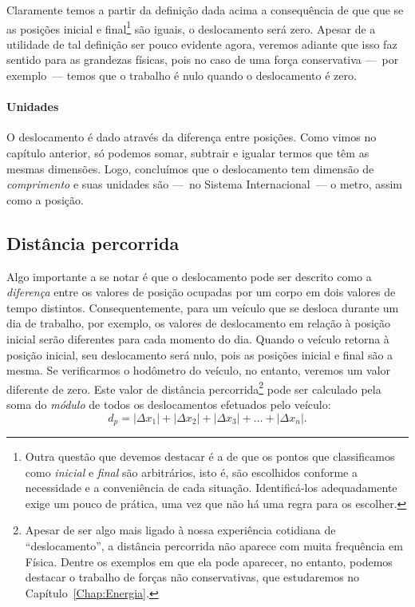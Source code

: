 Claramente temos a partir da definição dada acima a consequência de que que se as posições inicial e final\footnote{Outra questão que devemos destacar é a de que os pontos que classificamos como \emph{inicial} e \emph{final} são arbitrários, isto é, são escolhidos conforme a necessidade e a conveniência de cada situação. Identificá-los adequadamente exige um pouco de prática, uma vez que não há uma regra para os escolher.} são iguais, o deslocamento será zero. Apesar de a utilidade de tal definição ser pouco evidente agora, veremos adiante que isso faz sentido para as grandezas físicas, pois no caso de uma força conservativa ---~por exemplo~--- temos que o trabalho é nulo quando o deslocamento é zero.

\paragraph{Unidades}

O deslocamento é dado através da diferença entre posições. Como vimos no capítulo anterior, só podemos somar, subtrair e igualar termos que têm as mesmas dimensões. Logo, concluímos que o deslocamento tem dimensão de \emph{comprimento} e suas unidades são ---~no Sistema Internacional~--- o metro, assim como a posição.

\subsection{Distância percorrida}

Algo importante a se notar é que o deslocamento pode ser descrito como a \emph{diferença} entre os valores de posição ocupadas por um corpo em dois valores de tempo distintos. Consequentemente, para um veículo que se desloca durante um dia de trabalho, por exemplo, os valores de deslocamento em relação à posição inicial serão diferentes para cada momento do dia. Quando o veículo retorna à posição inicial, seu deslocamento será nulo, pois as posições inicial e final são a mesma. Se verificarmos o hodômetro do veículo, no entanto, veremos um valor diferente de zero. Este valor de distância percorrida\footnote{Apesar de ser algo mais ligado à nossa experiência cotidiana de ``deslocamento'', a distância percorrida não aparece com muita frequência em Física. Dentre os exemplos em que ela pode aparecer, no entanto, podemos destacar o trabalho de forças não conservativas, que estudaremos no Capítulo~\ref{Chap:Energia}.} pode ser calculado pela soma do \emph{módulo} de todos os deslocamentos efetuados pelo veículo:
\begin{equation}
  d_p = |\Delta x_1| + |\Delta x_2| + |\Delta x_3| + \dots + |\Delta x_n|.
\end{equation}

